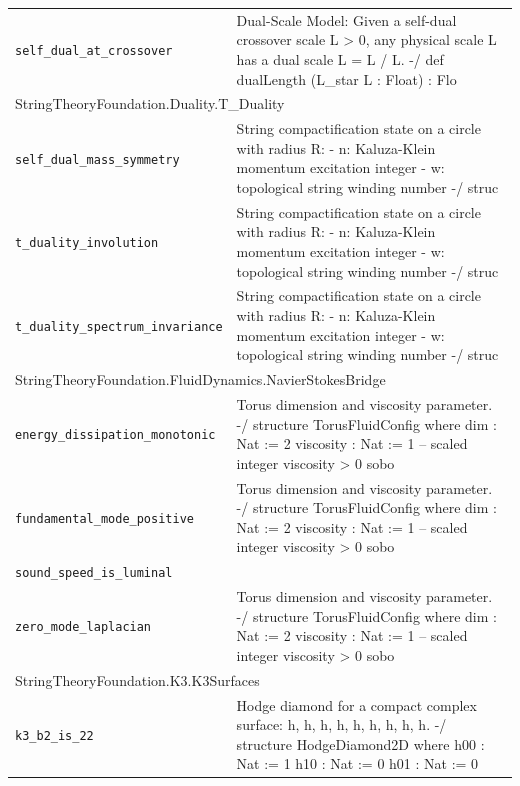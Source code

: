 \begin{longtable}{p{}p{}}
\quad\texttt{\footnotesize self\_dual\_at\_crossover} & {\footnotesize Dual-Scale Model: Given a self-dual crossover scale L > 0, any physical scale L has a dual scale L = L / L. -/ def dualLength (L\_star L : Float) : Flo} \\
\multicolumn{2}{l}{\textsf{\small StringTheoryFoundation.Duality.T\_Duality}} \\
\quad\texttt{\footnotesize self\_dual\_mass\_symmetry} & {\footnotesize String compactification state on a circle with radius R: - n: Kaluza-Klein momentum excitation integer - w: topological string winding number -/ struc} \\
\quad\texttt{\footnotesize t\_duality\_involution} & {\footnotesize String compactification state on a circle with radius R: - n: Kaluza-Klein momentum excitation integer - w: topological string winding number -/ struc} \\
\quad\texttt{\footnotesize t\_duality\_spectrum\_invariance} & {\footnotesize String compactification state on a circle with radius R: - n: Kaluza-Klein momentum excitation integer - w: topological string winding number -/ struc} \\
\multicolumn{2}{l}{\textsf{\small StringTheoryFoundation.FluidDynamics.NavierStokesBridge}} \\
\quad\texttt{\footnotesize energy\_dissipation\_monotonic} & {\footnotesize Torus dimension and viscosity parameter. -/ structure TorusFluidConfig where dim : Nat := 2 viscosity : Nat := 1 -- scaled integer viscosity  > 0 sobo} \\
\quad\texttt{\footnotesize fundamental\_mode\_positive} & {\footnotesize Torus dimension and viscosity parameter. -/ structure TorusFluidConfig where dim : Nat := 2 viscosity : Nat := 1 -- scaled integer viscosity  > 0 sobo} \\
\quad\texttt{\footnotesize sound\_speed\_is\_luminal} & {\footnotesize } \\
\quad\texttt{\footnotesize zero\_mode\_laplacian} & {\footnotesize Torus dimension and viscosity parameter. -/ structure TorusFluidConfig where dim : Nat := 2 viscosity : Nat := 1 -- scaled integer viscosity  > 0 sobo} \\
\multicolumn{2}{l}{\textsf{\small StringTheoryFoundation.K3.K3Surfaces}} \\
\quad\texttt{\footnotesize k3\_b2\_is\_22} & {\footnotesize Hodge diamond for a compact complex surface: h, h, h, h, h, h, h, h, h. -/ structure HodgeDiamond2D where h00 : Nat := 1 h10 : Nat := 0 h01 : Nat := 0} \\

\end{longtable}
